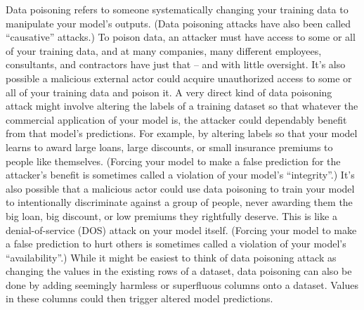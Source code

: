 \documentclass[fleqn]{article}
\begin{document}
Data poisoning refers to someone systematically changing your training data to manipulate your model's outputs. (Data poisoning attacks have also been called ``causative'' attacks.) To poison data, an attacker must have access to some or all of your training data, and at many companies, many different employees, consultants, and contractors have just that -- and with little oversight. It's also possible a malicious external actor could acquire unauthorized access to some or all of your training data and poison it. A very direct kind of data poisoning attack might involve altering the labels of a training dataset so that whatever the commercial application of your model is, the attacker could dependably benefit from that model's predictions. For example, by altering labels so that your model learns to award large loans, large discounts, or small insurance premiums to people like themselves. (Forcing your model to make a false prediction for the attacker's benefit is sometimes called a violation of your model's ``integrity''.) It's also possible that a malicious actor could use data poisoning to train your model to intentionally discriminate against a group of people, never awarding them the big loan, big discount, or low premiums they rightfully deserve. This is like a denial-of-service (DOS) attack on your model itself. (Forcing your model to make a false prediction to hurt others is sometimes called a violation of your model's ``availability''.) While it might be easiest to think of data poisoning attack as changing the values in the existing rows of a dataset, data poisoning can also be done by adding seemingly harmless or superfluous columns onto a dataset. Values in these columns could then trigger altered model predictions.\\
\end{document}
